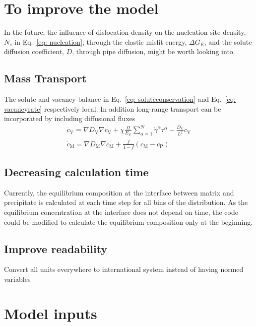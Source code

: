 \documentclass[11pt]{scrartcl}
\newcommand{\eref}[1]{Eq.~\eqref{#1}}
\begin{document}
%



\section{To improve the model}
In the future, the influence of dislocation density on the nucleation site density, $N_s$ in \eref{eq: nucleation}, through the elastic misfit energy, $\Delta G_E$, and the solute diffusion coefficient, $D$, through pipe diffusion, might be worth looking into.

\subsection{Mass Transport}

The solute and vacancy balance in \eref{eq: soluteconservation} and \eref{eq: vacancyrate} respectively local.
In addition long-range transport can be incorporated by including diffusional fluxes
%
\begin{align}
\label{eq: diffusion}
\dot{c}_\text{V} = \nabla D_\text{V} \nabla c_\text{V} + \chi \frac{\Omega}{E_\text{V}} \sum_{\alpha = 1}^{N} \dot{\gamma}^{\alpha} \tau^{\alpha} - \frac{D_\text{V}}{L^2} c_\text{V} \\
\dot{c}_\text{M} = \nabla D_\text{M} \nabla c_\text{M} + \frac{\dot{f}}{1-f}\left(c_\text{M} - c_\text{P}\right)
\end{align} 

\subsection{Decreasing calculation time}
Currently, the equilibrium composition at the interface between matrix and precipitate is calculated at each time step for all bins of the distribution. As the equilibrium concentration at the interface does not depend on time, the code could be modified to calculate the equilibrium composition only at the beginning.
\subsection{Improve readability}
Convert all units everywhere to international system instead of having normed variables
\section{Model inputs}
\end{document}
